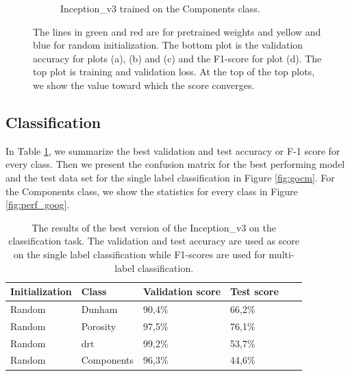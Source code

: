 \begin{figure}
{\begin{subfigure}[b]{.6\textwidth}
\caption{Inception\_v3 trained on the Components class.}
\label{fig:googinit_comp}
\end{subfigure}%
}
\caption[Training and validation plots for Inception\_v3]{The lines in green and red are for pretrained weights and yellow and blue for random initialization. The bottom plot is the validation accuracy for plots (a), (b) and (c) and the F1-score for plot (d). The top plot is training  and validation loss. At the top of the top plots, we show the value toward which the score converges.}
\label{fig:plotsgoogl}
\end{figure}


\subsection{Classification}
In Table \ref{tab:googbest}, we summarize the best validation and test accuracy or F-1 score for every class. Then we present the confusion matrix for the best performing model and the test data set for the single label classification in Figure \ref{fig:gocm}. For the Components class, we show the statistics for every class in Figure \ref{fig:perf_goog}. 

\begin{table}
\caption[Scores of best performing Inception\_v3]{\label{tab:googbest} The results of the best version of the Inception\_v3 on the classification task. The validation and test accuracy are used as score on the single label classification while F1-scores are used for multi-label classification.}
\centering
\begin{tabular}[b]{| l | l | l | l | l |}
\hline
    Initialization & Class & Validation score & Test score \ \\ \hline
    Random & Dunham &  90,4\%  & 66,2\% \\ \hline
    Random & Porosity &  97,5\%  & 76,1\% \\ \hline
    Random &\gls{drt} & 99,2\% & 53,7\% \\ \hline
    Random &Components & 96,3\% &  44,6\% \\ \hline
\end{tabular} 
\end{table}

